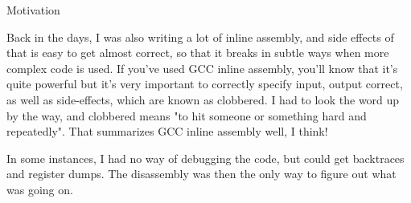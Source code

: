 \documentclass{beamer}
\begin{document}
\begin{frame}[fragile]{Motivation}
{    Back in the days, I was also writing a lot of inline assembly, and side effects of that is easy
    to get almost correct, so that it breaks in subtle ways when more complex code is used. If you've
    used GCC inline assembly, you'll know that it's quite powerful but it's very important to correctly
    specify input, output correct, as well as side-effects, which are known as clobbered. I had to
    look the word up by the way, and clobbered means "to hit someone or something hard and repeatedly".
    That summarizes GCC inline assembly well, I think!

    In some instances, I had no way of debugging the code, but could get backtraces and register dumps.
    The disassembly was then the only way to figure out what was going on.
  }
\end{frame}
\end{document}
